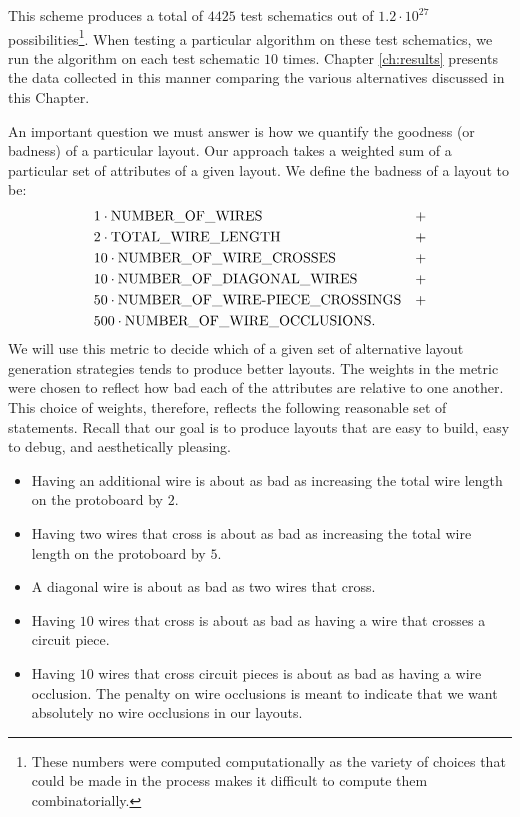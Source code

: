 This scheme produces a total of $4425$ test schematics out of $1.2\cdot10^{27}$
possibilities\footnote{These numbers were computed computationally as the
variety of choices that could be made in the process makes it difficult to
compute them combinatorially.}.
When testing a particular algorithm on these test
schematics, we run the algorithm on each test schematic $10$ times. Chapter
\ref{ch:results} presents the data collected in this manner comparing the
various alternatives discussed in this Chapter.

An important question we must answer is how we quantify the goodness (or badness)
of a particular layout. Our approach takes a weighted sum of a particular set of
attributes of a given layout. We define the badness of a layout to be:
\begin{align*}
\centering
&1 \cdot \text{NUMBER\_OF\_WIRES} &+ \\
&2 \cdot \text{TOTAL\_WIRE\_LENGTH} &+ \\
&10 \cdot \text{NUMBER\_OF\_WIRE\_CROSSES} &+ \\
&10 \cdot \text{NUMBER\_OF\_DIAGONAL\_WIRES} &+ \\
&50 \cdot \text{NUMBER\_OF\_WIRE-PIECE\_CROSSINGS} &+ \\
&500 \cdot \text{NUMBER\_OF\_WIRE\_OCCLUSIONS}.
\end{align*}
We will use this metric to decide which of a given set of alternative
layout generation strategies tends to produce better layouts.
The weights in the metric were chosen to reflect how
bad each of the attributes are relative to one another. This choice of weights,
therefore, reflects the following reasonable set of statements. Recall that our
goal is to produce layouts that are easy to build, easy to debug, and
aesthetically pleasing.
\begin{itemize}
\item Having an additional wire is about as bad as increasing the total wire
length on the protoboard by $2$.
\item Having two wires that cross is about as bad as increasing the total
wire length on the protoboard by $5$.
\item A diagonal wire is about as bad as two wires that cross.
\item Having $10$ wires that cross is about as bad as having a wire that
crosses a circuit piece.
\item Having $10$ wires that cross circuit pieces is about as bad as having a
wire occlusion. The penalty on wire occlusions is meant to indicate that we want
absolutely no wire occlusions in our layouts.
\end{itemize}
